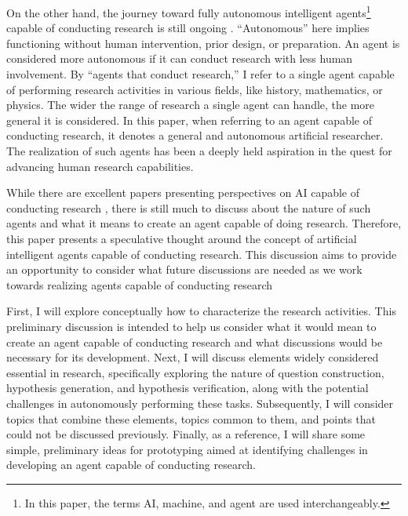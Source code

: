 \documentclass{article}
\begin{document}
On the other hand, the journey toward fully autonomous intelligent agents\footnote{
In this paper, the terms AI, machine, and agent are used interchangeably.
} capable of conducting research is still ongoing \cite{zenil2023future,coley2020autonomousII}. ``Autonomous'' here implies functioning without human intervention, prior design, or preparation. An agent is considered more autonomous if it can conduct research with less human involvement. By ``agents that conduct research,'' I refer to a single agent capable of performing research activities in various fields, like history, mathematics, or physics. The wider the range of research a single agent can handle, the more general it is considered. In this paper, when referring to an agent capable of conducting research, it denotes a general and autonomous artificial researcher. The realization of such agents has been a deeply held aspiration in the quest for advancing human research capabilities.

While there are excellent papers presenting perspectives on AI capable of conducting research \cite{zenil2023future,coley2020autonomous,coley2020autonomousII,kitano2021nobel,wang2023scientific,zenil2023,zhang2023artificial,hope2022computational,national2022automated}, there is still much to discuss about the nature of such agents and what it means to create an agent capable of doing research. Therefore, this paper presents a speculative thought around the concept of artificial intelligent agents capable of conducting research. This discussion aims to provide an opportunity to consider what future discussions are needed as we work towards realizing agents capable of conducting research 

First, I will explore conceptually how to characterize the research activities. This preliminary discussion is intended to help us consider what it would mean to create an agent capable of conducting research and what discussions would be necessary for its development. Next, I will discuss elements widely considered essential in research, specifically exploring the nature of question construction, hypothesis generation, and hypothesis verification, along with the potential challenges in autonomously performing these tasks.  Subsequently, I will consider topics that combine these elements, topics common to them, and points that could not be discussed previously. Finally, as a reference, I will share some simple, preliminary ideas for prototyping aimed at identifying challenges in developing an agent capable of conducting research.
\end{document}
